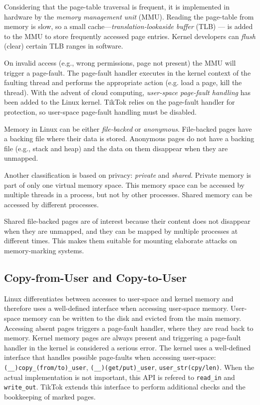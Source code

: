 \documentclass[conference]{IEEEtran}
\newcommand{\sysname}{TikTok}
\begin{document}
Considering that the page-table traversal is frequent, it is implemented in
hardware by the \emph{memory management unit} (MMU). Reading the page-table from
memory is slow, so a small cache---\emph{translation-lookaside buffer} (TLB)
--- is added to the MMU to store frequently accessed page entries. Kernel
developers can \emph{flush} (clear) certain TLB ranges in software.

On invalid access (e.g., wrong permissions, page not present) the MMU will
trigger a page-fault. The page-fault handler executes in the kernel context of
the faulting thread and performs the appropriate action (e.g. load a page, kill
the thread). With the advent of cloud computing, \emph{user-space page-fault
handling} has been added to the Linux kernel. \sysname{} relies on the page-fault
handler for protection, so user-space page-fault handling must be disabled.

Memory in Linux can be either \emph{file-backed} or \emph{anonymous}.
File-backed pages have a backing file where their data is stored. Anonymous
pages do not have a backing file (e.g., stack and heap) and the data on them
disappear when they are unmapped.

Another classification is based on privacy: \emph{private} and \emph{shared}.
Private memory is part of only one virtual memory space. This memory space can
be accessed by multiple threads in a process, but not by other processes. Shared
memory can be accessed by different processes.

Shared file-backed pages are of interest because their content does not
disappear when they are unmapped, and they can be mapped by multiple
processes at different times. This makes them suitable for mounting elaborate
attacks on memory-marking systems.

\subsection{Copy-from-User and Copy-to-User}
\label{subsec:copy}
Linux differentiates between accesses to user-space and kernel memory and
therefore uses a well-defined interface when accessing user-space memory.
User-space memory can be written to the disk and evicted from the main memory.
Accessing absent pages triggers a page-fault handler, where they are read back
to memory. Kernel memory pages are always present and triggering a page-fault
handler in the kernel is considered a serious error. The kernel uses a well-defined
interface that handles possible page-faults when accessing user-space:
\texttt{(\_\_)copy\_(from/to)\_user}, \texttt{(\_\_)(get/put)\_user},
\texttt{user\_str(cpy/len)}. When the actual implementation is not important,
this API is refered to \texttt{read\_in} and \texttt{write\_out}. \sysname{}
extends this interface to perform additional checks and the bookkeeping of
marked pages.
\end{document}
